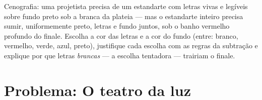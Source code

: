 \begin{exercise}[$\star\star\star$]\label{exo:g8:colors-spectra:12}
Cenografia: uma projetista precisa de um estandarte com letras vivas
e legíveis sobre fundo preto sob a  branca da plateia --- mas o
estandarte inteiro precisa sumir, uniformemente preto, letras e fundo
juntos, sob o banho vermelho profundo do finale. Escolha a cor das
letras e a cor do fundo (entre: branco, vermelho, verde, azul,
preto), justifique cada escolha com as regras da subtração e explique
por que letras \emph{brancas} --- a escolha tentadora --- trairiam o
finale.
\end{exercise}

\section{Problema: O teatro da luz}

